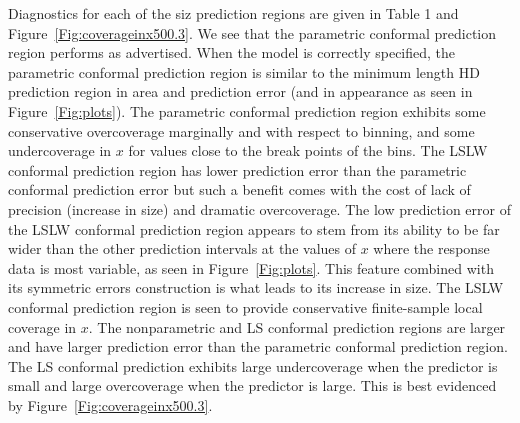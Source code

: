 \documentclass[11pt]{article}\usepackage[]{graphicx}\usepackage[]{color}
\begin{document}
Diagnostics for each of the siz prediction regions are given in Table 1 and 
Figure~\ref{Fig:coverageinx500.3}.  We see that the parametric 
conformal prediction region performs as advertised.  When the model is 
correctly specified, the parametric conformal prediction region is similar to 
the minimum length HD prediction region in area and prediction error (and in 
appearance as seen in Figure~\ref{Fig:plots}).  The parametric conformal 
prediction region exhibits some conservative overcoverage marginally and with 
respect to binning, and some undercoverage in $x$ for values close to the 
break points of the bins.  The LSLW conformal prediction region has lower 
prediction error than the parametric conformal prediction error but such a 
benefit comes with the cost of lack of precision (increase in size) and 
dramatic overcoverage.  The low prediction error of the LSLW conformal 
prediction region appears to stem from its ability to be far wider than 
the other prediction intervals at the values of $x$ where the response data 
is most variable, as seen in Figure~\ref{Fig:plots}.  This feature combined 
with its symmetric errors construction is what leads to its increase in size.  
The LSLW conformal prediction region is seen to provide conservative 
finite-sample local coverage in $x$.
The nonparametric and LS conformal prediction regions are larger and have 
larger prediction error than the parametric conformal prediction region.  
The LS conformal prediction exhibits large undercoverage when the predictor 
is small and large overcoverage when the predictor is large.  This is best 
evidenced by Figure~\ref{Fig:coverageinx500.3}.
\end{document}
